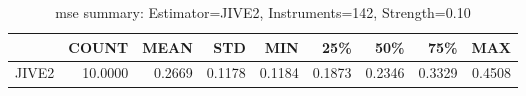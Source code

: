 \begin{table}[ht]
\centering
\caption{mse summary: Estimator=JIVE2, Instruments=142, Strength=0.10}
\begin{tabular}{lrrrrrrrr}
\toprule
 & COUNT & MEAN & STD & MIN & 25\% & 50\% & 75\% & MAX \\
\midrule
JIVE2 & 10.0000 & 0.2669 & 0.1178 & 0.1184 & 0.1873 & 0.2346 & 0.3329 & 0.4508 \\
\bottomrule
\end{tabular}
\end{table}
